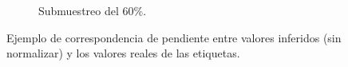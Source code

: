 \begin{figure}[htp]
\begin{subfigure}[b]{0.31\textwidth}
  \caption{Submuestreo del 60\%.}
  \end{subfigure}
  \caption{Ejemplo de correspondencia de pendiente entre valores inferidos (sin normalizar) y 
  los valores reales de las etiquetas.} 
  \label{fig:Cualitativos}
\end{figure}

